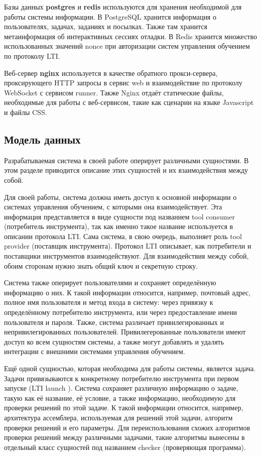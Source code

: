 \documentclass[a4paper,article,14pt]{extarticle}
\begin{document}
Базы данных \textbf{postgres} и \textbf{redis} используются для хранения необходимой для работы системы информации. В PostgreSQL хранится информация о пользователях, задачах, заданиях и посылках. Также там хранится метаинформация об интерактивных сессиях отладки. В Redis хранится множество использованных значений nonce при авторизации систем управления обучением по протоколу LTI.

Веб-сервер \textbf{nginx} используется в качестве обратного прокси-сервера, проксирующего HTTP запросы в сервис web и взаимодействие по протоколу WebSocket с сервисом runner. Также Nginx отдаёт статические файлы, необходимые для работы с веб-сервисом, такие как сценарии на языке Javascript и файлы CSS.

\subsection{Модель данных}

Разрабатываемая система в своей работе оперирует различными сущностями. В этом разделе приводится описание этих сущностей и их взаимодействия между собой.

Для своей работы, система должна иметь доступ к основной информации о системах управления обучением, с которыми она взаимодействует. Эта информация представляется в виде сущности под названием tool consumer (потребитель инструмента), так как именно такое название используется в описании протокола LTI\cite{lti}. Сама система, в свою очередь, выполняет роль tool provider (поставщик инструмента). Протокол LTI описывает, как потребители и поставщики инструментов взаимодействуют. Для взаимодействия между собой, обоим сторонам нужно знать общий ключ и секретную строку.

Система также оперирует пользователями и сохраняет определённую информацию о них. К такой информации относится, например, почтовый адрес, полное имя пользователя и метод входа в систему: через привязку к определённому потребителю инструмента, или через предоставление имени пользователя и пароля. Также, система различает привилегированных и непривилегированных пользователей. Привилегерованные пользователи имеют доступ ко всем сущностям системы, а также могут добавлять и удалять интеграции с внешними системами управления обучением.

Ещё одной сущностью, которая необходима для работы системы, является задача. Задачи привязываются к конкретному потребителю инструмента при первом запуске (LTI launch \cite{lti}). Система сохраняет различную информацию о задаче, такую как её название, её условие, а также информацию, необходимую для проверки решений по этой задаче. К такой информации относится, например, архитектура ассемблера, используемая для решений этой задачи, алгоритм проверки решений и его параметры. Для переиспользования схожих алгоритмов проверки решений между различными задачами, такие алгоритмы вынесены в отдельный класс сущностей под названием checker (проверяющая программа).
\end{document}
